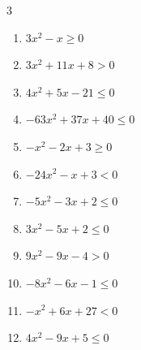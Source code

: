 \begin{multicols}{3}
\begin{enumerate}

  \item $3x^{2}-x\geq 0$


  \item $3x^{2}+11x+8>0$


  \item $4x^{2}+5x-21\leq 0$


  \item $-63x^{2}+37x+40\leq 0$


  \item $-x^{2}-2x+3\geq 0$

        \phantom{$\displaystyle -3 \leqq x \leqq 1$}

  \item $-24x^{2}-x+3<0$


  \item $-5x^{2}-3x+2\leq 0$


  \item $3x^{2}-5x+2\leq 0$


  \item $9x^{2}-9x-4>0$


\columnbreak %

  \item $-8x^{2}-6x-1\leq 0$


  \item $-x^{2}+6x+27<0$

        \phantom{$\displaystyle x < -3 , \; 9 < x$}

  \item $4x^{2}-9x+5\leq 0$


\end{enumerate}
\end{multicols}
